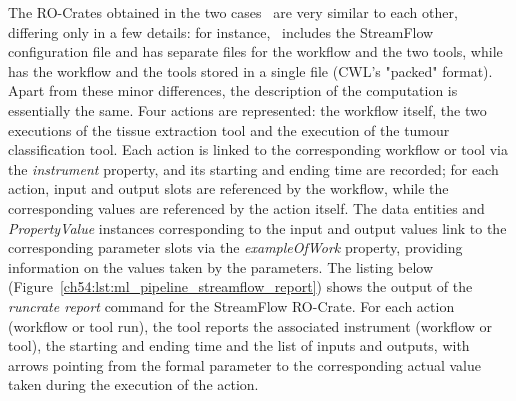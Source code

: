 The RO-Crates obtained in the two cases~\cite{Colonnelli 2023, Leo 2023c}
are very similar to each other, differing only in a few details: for instance,~\cite{Colonnelli 2023} includes the StreamFlow configuration file and has separate files for the workflow and the two tools, while
\cite{Leo 2023c} has the workflow and the tools stored in a single file (CWL's "packed" format).
Apart from these minor differences, the description of the computation is essentially the same.
Four actions are represented: the workflow itself, the two executions of the tissue extraction tool and the execution of the tumour classification tool.
Each action is linked to the corresponding workflow or tool via the
\emph{instrument} property, and its starting and ending time are recorded; for each action, input and output slots are referenced by the workflow, while the corresponding values are referenced by the action itself.
The data entities and \emph{PropertyValue} instances corresponding to the input and output values link to the corresponding parameter slots via the \emph{exampleOfWork} property, providing information on the values taken by the parameters.
The listing below (Figure~\vref{ch54:lst:ml_pipeline_streamflow_report}) shows the output of the
\emph{runcrate report} command for the StreamFlow RO-Crate. 
For each action (workflow or tool run), the tool reports the associated instrument (workflow or tool), the starting and ending time and the list of inputs and outputs, with arrows pointing from the formal parameter to the corresponding actual value taken during the execution of the action.

